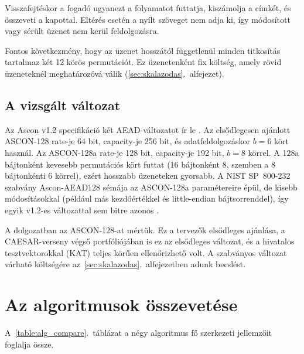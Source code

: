 \documentclass[a4paper,12pt]{report}
\theoremstyle{definition}
\theoremstyle{remark}
\begin{document}
Visszafejtéskor a fogadó ugyanezt a folyamatot futtatja, kiszámolja a címkét, és összeveti a kapottal. Eltérés esetén a nyílt szöveget nem adja ki, így módosított vagy sérült üzenet nem kerül feldolgozásra.

Fontos következmény, hogy az üzenet hosszától függetlenül minden titkosítás tartalmaz két 12 körös permutációt. Ez üzenetenként fix költség, amely rövid üzeneteknél meghatározóvá válik (\ref{sec:skalazodas}.~alfejezet).

\subsection{A vizsgált változat}\label{sec:ascon_valtozat}

Az Ascon v1.2 specifikáció két AEAD-változatot ír le \cite{Dobraunig2021}. Az elsődlegesen ajánlott ASCON-128 rate-je 64 bit, capacity-je 256 bit, és adatfeldolgozáskor $b = 6$ kört használ. Az ASCON-128a rate-je 128 bit, capacity-je 192 bit, $b = 8$ körrel. A 128a bájtonként kevesebb permutációs kört futtat (16 bájtonként 8, szemben a 8 bájtonkénti 6 körrel), ezért hosszabb üzeneteken gyorsabb. A NIST SP~800-232 szabvány Ascon-AEAD128 sémája az ASCON-128a paramétereire épül, de kisebb módosításokkal (például más kezdőértékkel és little-endian bájtsorrenddel), így egyik v1.2-es változattal sem bitre azonos \cite{NISTSP800232}.

A dolgozatban az ASCON-128-at mértük. Ez a tervezők elsődleges ajánlása, a CAESAR-verseny végső portfóliójában is ez az elsődleges változat, és a hivatalos tesztvektorokkal (KAT) teljes körűen ellenőrizhető volt. A szabványos változat várható költségére az~\ref{sec:skalazodas}.~alfejezetben adunk becslést.

\section{Az algoritmusok összevetése}\label{sec:alg_osszehasonlitas}

A~\ref{table:alg_compare}.~táblázat a négy algoritmus fő szerkezeti jellemzőit foglalja össze.
\end{document}
